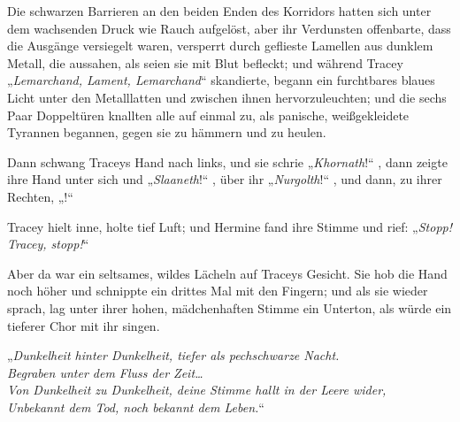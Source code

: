 Die schwarzen Barrieren an den beiden Enden des Korridors hatten sich unter dem wachsenden Druck wie Rauch aufgelöst, aber ihr Verdunsten offenbarte, dass die Ausgänge versiegelt waren, versperrt durch geflieste Lamellen aus dunklem Metall, die aussahen, als seien sie mit Blut befleckt; und während Tracey „\emph{Lemarchand, Lament, Lemarchand}“ skandierte, begann ein furchtbares blaues Licht unter den Metalllatten und zwischen ihnen hervorzuleuchten; und die sechs Paar Doppeltüren knallten alle auf einmal zu, als panische, weißgekleidete Tyrannen begannen, gegen sie zu hämmern und zu heulen.

Dann schwang Traceys Hand nach links, und sie schrie „\emph{Khornath}!“ , dann zeigte ihre Hand unter sich und „\emph{Slaaneth}!“ , über ihr „\emph{Nurgolth}!“ , und dann, zu ihrer Rechten, „!“

Tracey hielt inne, holte tief Luft; und Hermine fand ihre Stimme und rief: „\emph{Stopp! Tracey, stopp!}“

Aber da war ein seltsames, wildes Lächeln auf Traceys Gesicht. Sie hob die Hand noch höher und schnippte ein drittes Mal mit den Fingern; und als sie wieder sprach, lag unter ihrer hohen, mädchenhaften Stimme ein Unterton, als würde ein tieferer Chor mit ihr singen.

„\emph{Dunkelheit hinter Dunkelheit, tiefer als pechschwarze Nacht.\\
Begraben unter dem Fluss der Zeit…\\
Von Dunkelheit zu Dunkelheit, deine Stimme hallt in der Leere wider,\\
Unbekannt dem Tod, noch bekannt dem Leben.}“


